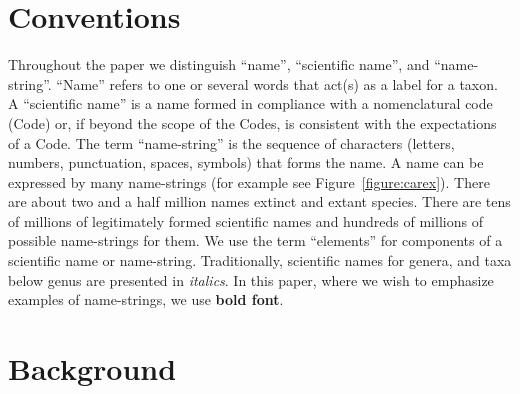 \documentclass{bmcart}
\begin{document}
\listoftodos[Notes]



\section*{Conventions}

Throughout the paper we distinguish ``name'', ``scientific name'', and ``name-string''. ``Name'' refers to one or several words that act(s) as a label for a taxon. A ``scientific name'' is a name formed in compliance with a nomenclatural code (Code) or, if beyond the scope of the Codes, is consistent with the expectations of a Code. The term ``name-string'' is the sequence of characters (letters, numbers, punctuation, spaces, symbols) that forms the name. A name can be expressed by many name-strings (for example see Figure~\ref{figure:carex}). There are about two and a half million names extinct and extant species. There are tens of millions of legitimately formed scientific names and hundreds of millions of possible name-strings for them. We use the term ``elements'' for  components of a scientific name or name-string. Traditionally, scientific names for genera, and taxa below genus are presented in \textit{italics}. In this paper, where we wish to emphasize examples of name-strings, we use \textbf{bold font}.

\section*{Background}
\end{document}
